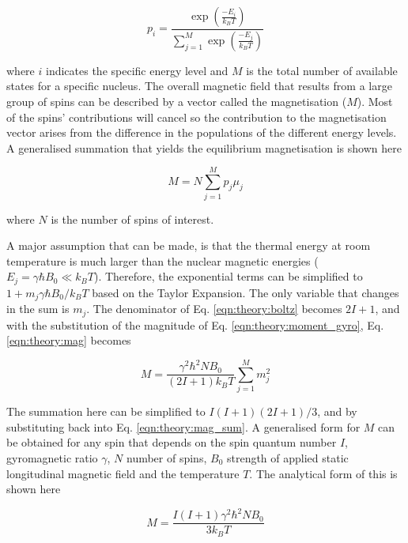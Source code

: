 \begin{equation}
    p_i = \frac{\exp\left(\frac{-E_i}{k_BT}\right)}{\displaystyle \sum_{j = 1}^{M}\exp\left(\frac{-E_j}{k_BT}\right)}
    \label{eqn:theory:boltz}
\end{equation}

\noindent where $i$ indicates the specific energy level and $M$ is the total number of available states for a specific nucleus. The overall magnetic field that results from a large group of spins can be described by a vector called the magnetisation ($M$). Most of the spins' contributions will cancel so the contribution to the magnetisation vector arises from the difference in the populations of the different energy levels. A generalised summation that yields the equilibrium magnetisation is shown here

\begin{equation}
    M = N\sum_{j = 1}^{M}p_j\mu_j
    \label{eqn:theory:mag}
\end{equation}

\noindent where $N$ is the number of spins of interest. 

A major assumption that can be made, is that the thermal energy at room temperature is much larger than the nuclear magnetic energies ($E_j = \gamma \hbar B_0\ll k_BT$). Therefore, the exponential terms can be simplified to $1 +m_j\gamma \hbar B_0/k_BT$ based on the Taylor Expansion. The only variable that changes in the sum is $m_j$. The denominator of Eq. \ref{eqn:theory:boltz} becomes $2I+1$, and with the substitution of the magnitude of Eq. \ref{eqn:theory:moment_gyro}, Eq. \ref{eqn:theory:mag} becomes

\begin{equation}
    M = \frac{\gamma^2\hbar^2NB_0}{(2I+1)k_BT}\sum_{j=1}^{M}m_j^2
    \label{eqn:theory:mag_sum}
\end{equation}

\noindent The summation here can be simplified to $I(I+1)(2I+1)/3$, and by substituting back into Eq. \ref{eqn:theory:mag_sum}. A generalised form for $M$ can be obtained for any spin that depends on the spin quantum number $I$, gyromagnetic ratio $\gamma$, $N$ number of spins, $B_0$ strength of applied static longitudinal magnetic field and the temperature $T$. The analytical form of this is shown here

\begin{equation}
    M = \frac{I(I+1)\gamma^2 \hbar^2 N B_0}{3k_BT}
    \label{eqn:theory:mag_s}
\end{equation}

